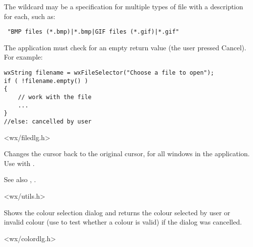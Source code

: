 The wildcard may be a specification for multiple types of file
with a description for each, such as:

\begin{verbatim}
 "BMP files (*.bmp)|*.bmp|GIF files (*.gif)|*.gif"
\end{verbatim}

The application must check for an empty return value (the user pressed
Cancel). For example:

\begin{verbatim}
wxString filename = wxFileSelector("Choose a file to open");
if ( !filename.empty() )
{
    // work with the file
    ...
}
//else: cancelled by user
\end{verbatim}


<wx/filedlg.h>


\label{wxendbusycursor}


Changes the cursor back to the original cursor, for all windows in the application.
Use with .

See also , .


<wx/utils.h>


\label{wxgetcolourfromuser}


Shows the colour selection dialog and returns the colour selected by user or
invalid colour (use  to test whether a colour
is valid) if the dialog was cancelled.





<wx/colordlg.h>


\label{wxgetfontfromuser}


